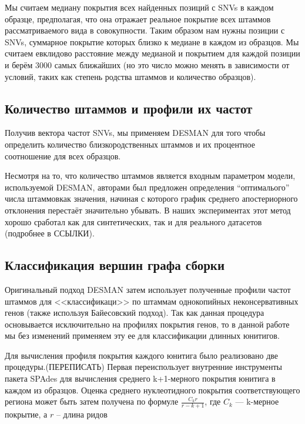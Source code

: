 \documentclass{spbau-diploma}
\begin{document}
Мы считаем медиану покрытия всех найденных позиций с SNVs в каждом образце, предполагая, что она отражает реальное покрытие всех штаммов рассматриваемого вида в совокупности. Таким образом нам нужны позиции с SNVs, суммарное покрытие которых близко к медиане в каждом из образцов. Мы считаем евклидово расстояние между медианой и покрытием для каждой позиции и берём 3000 самых ближайших (но это число можно менять в зависимости от условий, таких как степень родства штаммов и количество образцов).

\subsection{Количество штаммов и профили их частот}

Получив вектора частот SNVs, мы применяем DESMAN для того чтобы определить количество близкородственных штаммов и их процентное соотношение для всех образцов. 

Несмотря на то, что количество штаммов является входным параметром модели, используемой DESMAN, авторами был предложен определения “оптималього” числа штаммовкак значения, начиная с которого график среднего апостериорного отклонения перестаёт значительно убывать. В наших экспериментах этот метод хорошо сработал как для синтетических, так и для реального датасетов (подробнее в ССЫЛКИ).

\subsection{Классификация вершин графа сборки}

Оригинальный подход DESMAN затем использует полученные профили частот штаммов для <<классификаци>> по штаммам однокопийных неконсервативных генов (также используя Байесовский подход). Так как данная процедура основывается исключительно на профилях покрытия генов, то в данной работе мы без изменений применяем эту ее для классификации длинных юнитигов. 


Для вычисления профиля покрытия каждого юнитига было реализовано две процедуры.(ПЕРЕПИСАТЬ)
Первая переиспользует внутренние инструменты пакета SPAdes для вычисления среднего k+1-мерного покрытия юнитига в каждом из образцов. Оценка среднего нуклеотидного покрытия соответствующего региона может быть затем получена по формуле $\frac{C_k r}{r - k + 1}$, где $C_k$ --- k-мерное покрытие, а $r$ -- длина ридов
\end{document}
